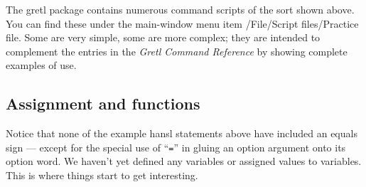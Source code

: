 The gretl package contains numerous command scripts of the sort shown
above. You can find these under the main-window menu item
\textsf{/File/Script files/Practice file}. Some are very simple, some
are more complex; they are intended to complement the entries in the
\textit{Gretl Command Reference} by showing complete examples of use.

\subsection{Assignment and functions}

Notice that none of the example hansl statements above have included
an equals sign --- except for the special use of ``\texttt{=}'' in
gluing an option argument onto its option word. We haven't yet
defined any variables or assigned values to variables. This is where
things start to get interesting. 

      

